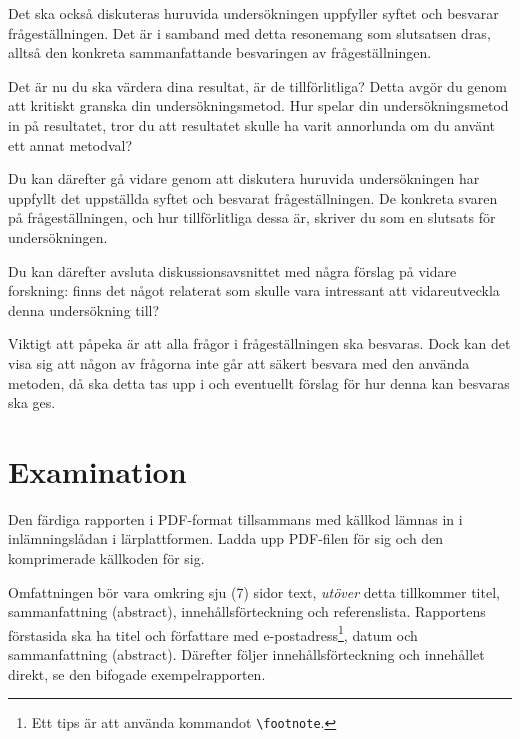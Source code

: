 \documentclass[a4paper]{miunasgn}
\begin{document}
Det ska också diskuteras huruvida undersökningen uppfyller syftet och besvarar 
frågeställningen.
Det är i samband med detta resonemang som slutsatsen dras, alltså den konkreta 
sammanfattande besvaringen av frågeställningen.

Det är nu du ska värdera dina resultat, är de tillförlitliga?
Detta avgör du genom att kritiskt granska din undersökningsmetod.
Hur spelar din undersökningsmetod in på resultatet, tror du att resultatet 
skulle ha varit annorlunda om du använt ett annat metodval?

Du kan därefter gå vidare genom att diskutera huruvida undersökningen har 
uppfyllt det uppställda syftet och besvarat frågeställningen.
De konkreta svaren på frågeställningen, och hur tillförlitliga dessa är, 
skriver du som en slutsats för undersökningen.

Du kan därefter avsluta diskussionsavsnittet med några förslag på vidare 
forskning: finns det något relaterat som skulle vara intressant att 
vidareutveckla denna undersökning till?

Viktigt att påpeka är att alla frågor i frågeställningen ska besvaras.
Dock kan det visa sig att någon av frågorna inte går att säkert besvara med den 
använda metoden, då ska detta tas upp i och eventuellt förslag för hur denna 
kan besvaras ska ges.


\section{Examination}

Den färdiga rapporten i PDF-format tillsammans med källkod lämnas in 
i inlämningslådan i lärplattformen.
Ladda upp PDF-filen för sig och den komprimerade källkoden för sig.

Omfattningen bör vara omkring sju (7) sidor text, \emph{utöver} detta 
tillkommer titel, sammanfattning (abstract), innehållsförteckning och 
referenslista.
Rapportens förstasida ska ha titel och författare med e-postadress\footnote{%
  Ett tips är att använda kommandot \texttt{\textbackslash footnote}.
}, datum och sammanfattning (abstract).
Därefter följer innehållsförteckning och innehållet direkt, se den bifogade 
exempelrapporten.
\end{document}
